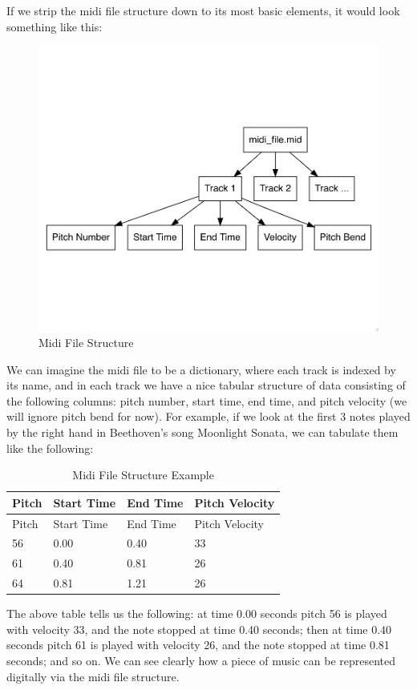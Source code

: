 \documentclass[12pt,oneside]{chicagocapstone}
\begin{document}
If we strip the midi file structure down to its most basic elements, it would look something like this:
\begin{figure}

{\centering \includegraphics[width=0.8\linewidth]{figure/midi_file_structure} 

}

\caption{Midi File Structure}\label{fig:unnamed-chunk-2}
\end{figure}
We can imagine the midi file to be a dictionary, where each track is indexed by its name, and in each track we have a nice tabular structure of data consisting of the following columns: pitch number, start time, end time, and pitch velocity (we will ignore pitch bend for now). For example, if we look at the first 3 notes played by the right hand in Beethoven's song Moonlight Sonata, we can tabulate them like the following:
\begin{longtable}[]{@{}llll@{}}
\caption{Midi File Structure Example}\tabularnewline
\toprule
Pitch & Start Time & End Time & Pitch Velocity\tabularnewline
\midrule
\endfirsthead
\toprule
Pitch & Start Time & End Time & Pitch Velocity\tabularnewline
\midrule
\endhead
56 & 0.00 & 0.40 & 33\tabularnewline
61 & 0.40 & 0.81 & 26\tabularnewline
64 & 0.81 & 1.21 & 26\tabularnewline
\bottomrule
\end{longtable}
The above table tells us the following: at time 0.00 seconds pitch 56 is played with velocity 33, and the note stopped at time 0.40 seconds; then at time 0.40 seconds pitch 61 is played with velocity 26, and the note stopped at time 0.81 seconds; and so on. We can see clearly how a piece of music can be represented digitally via the midi file structure.
\end{document}
